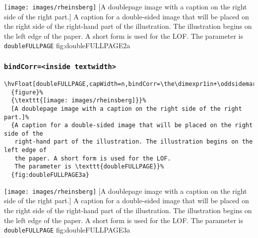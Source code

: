 \documentclass[twoside]{scrartcl}
\makeatletter
\let\hvBlindtext\Blindtext
\def\Blindtext{\par\color{black!40}\hvBlindtext\par\normalcolor}
\def\hvblindtext{\textcolor{black!40}{\blindtext@text}}
\makeatother
\begin{document}
%
  {\texttt{[image: images/rheinsberg]}}%
  [A doublepage image with a caption on the right side of the right part.]%
  {A caption for a double-sided image that will be placed on the right side of the
   right-hand part of the illustration. The illustration begins on the left edge of 
   the paper. A short form is used for the LOF. 
   The parameter is \texttt{doubleFULLPAGE}}%
  {fig:doubleFULLPAGE2a}



\Blindtext

\Blindtext

\hvblindtext

\subsubsection{\texttt{bindCorr=<inside textwidth>}}

\begin{lstlisting}
\hvFloat[doubleFULLPAGE,capWidth=n,bindCorr=\the\dimexpr1in+\oddsidemargin]%
  {figure}%
  {\texttt{[image: images/rheinsberg]}}%
  [A doublepage image with a caption on the right side of the right part.]%
  {A caption for a double-sided image that will be placed on the right side of the
   right-hand part of the illustration. The illustration begins on the left edge of 
   the paper. A short form is used for the LOF. 
   The parameter is \texttt{doubleFULLPAGE}}%
  {fig:doubleFULLPAGE3a}
\end{lstlisting}

%
  {\texttt{[image: images/rheinsberg]}}%
  [A doublepage image with a caption on the right side of the right part.]%
  {A caption for a double-sided image that will be placed on the right side of the
   right-hand part of the illustration. The illustration begins on the left edge of 
   the paper. A short form is used for the LOF. 
   The parameter is \texttt{doubleFULLPAGE}}%
  {fig:doubleFULLPAGE3a}


\Blindtext

\Blindtext
\end{document}
